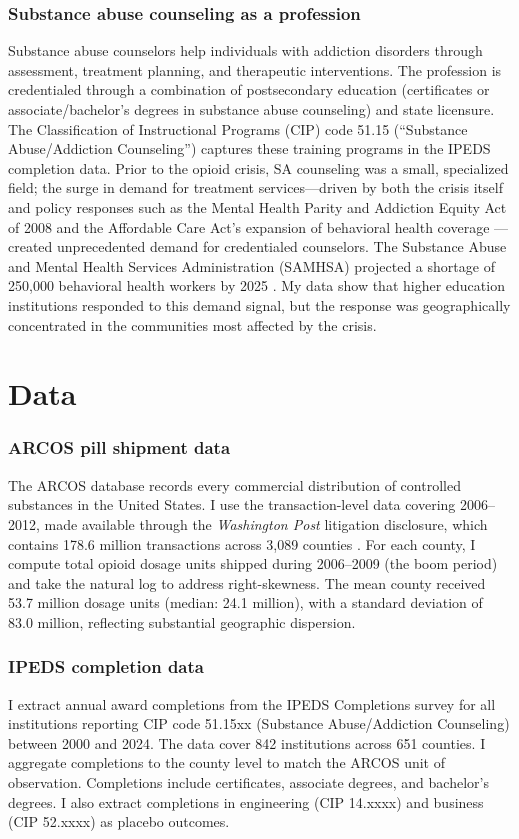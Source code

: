 \documentclass[12pt]{article}
\begin{document}
\subsubsection*{Substance abuse counseling as a profession} Substance abuse counselors help individuals with addiction disorders through assessment, treatment planning, and therapeutic interventions. The profession is credentialed through a combination of postsecondary education (certificates or associate/bachelor's degrees in substance abuse counseling) and state licensure. The Classification of Instructional Programs (CIP) code 51.15 (``Substance Abuse/Addiction Counseling'') captures these training programs in the IPEDS completion data. Prior to the opioid crisis, SA counseling was a small, specialized field; the surge in demand for treatment services---driven by both the crisis itself and policy responses such as the Mental Health Parity and Addiction Equity Act of 2008 and the Affordable Care Act's expansion of behavioral health coverage \citep{barry2010, beronio2014}---created unprecedented demand for credentialed counselors. The Substance Abuse and Mental Health Services Administration (SAMHSA) projected a shortage of 250,000 behavioral health workers by 2025 \citep{samhsa2013}. My data show that higher education institutions responded to this demand signal, but the response was geographically concentrated in the communities most affected by the crisis.


\section{Data}

\subsubsection*{ARCOS pill shipment data} The ARCOS database records every commercial distribution of controlled substances in the United States. I use the transaction-level data covering 2006--2012, made available through the \textit{Washington Post} litigation disclosure, which contains 178.6 million transactions across 3,089 counties \citep{arcos2019}. For each county, I compute total opioid dosage units shipped during 2006--2009 (the boom period) and take the natural log to address right-skewness. The mean county received 53.7 million dosage units (median: 24.1 million), with a standard deviation of 83.0 million, reflecting substantial geographic dispersion.

\subsubsection*{IPEDS completion data} I extract annual award completions from the IPEDS Completions survey for all institutions reporting CIP code 51.15xx (Substance Abuse/Addiction Counseling) between 2000 and 2024. The data cover 842 institutions across 651 counties. I aggregate completions to the county level to match the ARCOS unit of observation. Completions include certificates, associate degrees, and bachelor's degrees. I also extract completions in engineering (CIP 14.xxxx) and business (CIP 52.xxxx) as placebo outcomes.
\end{document}
